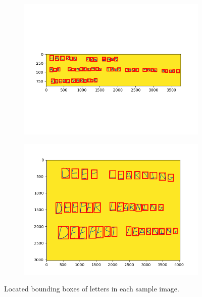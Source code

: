 \documentclass{article} %
\begin{document}
\begin{figure}[H]
\begin{subfigure}[b]{0.49\textwidth}
            \includegraphics[width=\textwidth]{4,2 img3.png}
        \end{subfigure}
        \begin{subfigure}[b]{0.49\textwidth}
            \includegraphics[width=\textwidth]{4,2 img4.png}
        \end{subfigure}
        \caption{Located bounding boxes of letters in each sample image.}
        \label{q43}
    \end{figure}
\end{document}
